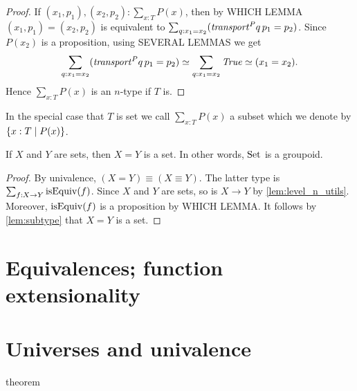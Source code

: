 \begin{proof}
If $(x_1,p_1),(x_2,p_2) : \sum_{x:T} P(x)$, then by WHICH LEMMA
$(x_1,p_1)=(x_2,p_2)$ is equivalent to 
$\sum_{q:x_1=x_2} (\mathord{\mathit{transport}}^P q\,p_1 = p_2)$. 
Since $P(x_2)$ is a proposition, using SEVERAL LEMMAS we get 
\[
\sum_{q:x_1=x_2} ({\mathord{\mathit{transport}}}^P q\,p_1 = p_2) \simeq 
\sum_{q:x_1=x_2} \mathop{\mathit{True}} \simeq (x_1=x_2).
\]
Hence $\sum_{x:T} P(x)$ is an $n$-type if $T$ is.
\end{proof}
In the special case that $T$ is set we call 
$\sum_{x:T} P(x)$ a subset which we denote by 
$\{x:T \mid P(x)\}$.

\begin{lemma}\label{lem:eq_of_sets_is_set}
If $X$ and $Y$ are sets, then $X=Y$ is a set. 
In other words, $\mathord{\mathrm{Set}}$ is a groupoid.
\end{lemma}

\begin{proof}
By univalence, $(X=Y) \equiv (X\equiv Y)$. The latter type is
$\sum_{f:X\to Y} \mathrm{isEquiv}(f)$. Since $X$ and $Y$ are sets,
so is $X\to Y$ by \cref{lem:level_n_utils}. Moreover,
$\mathrm{isEquiv}(f)$ is a proposition by WHICH LEMMA.
It follows by \cref{lem:subtype} that $X=Y$ is a set.  
\end{proof}


\section{Equivalences; function extensionality}
\label{sec:equivalences}

\section{Universes and univalence}
\label{sce:universes}

\begin{theorem} theorem \end{theorem}

